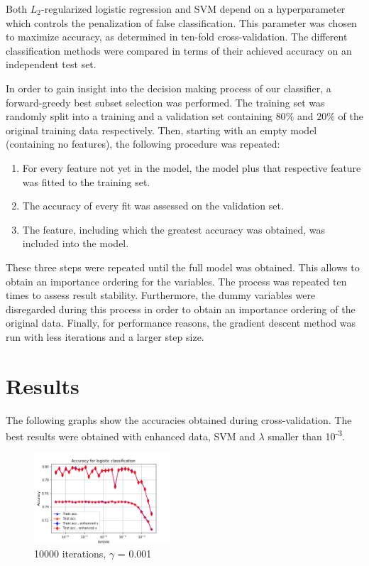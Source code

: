 \documentclass[10pt,conference,compsocconf]{IEEEtran}
\begin{document}
\par
Both $L_2$-regularized logistic regression and SVM depend on a hyperparameter which controls the penalization of false classification. This parameter was chosen to maximize accuracy, as determined in ten-fold cross-validation. The different classification methods were compared in terms of their achieved accuracy on an independent test set. %
\par
In order to gain insight into the decision making process of our classifier, a forward-greedy best subset selection was performed. The training set was randomly split into a training and a validation set containing $80\%$ and $20\%$ of the original training data respectively. Then, starting with an empty model (containing no features), the following procedure was repeated: 
\begin{enumerate}
	\item For every feature not yet in the model, the model plus that respective feature was fitted to the training set.
	\item The accuracy of every fit was assessed on the validation set.  
	\item The feature, including which the greatest accuracy was obtained, was included into the model.
\end{enumerate}
These three steps were repeated until the full model was obtained. This allows to obtain an importance ordering for the variables. The process was repeated ten times to assess result stability. Furthermore, the dummy variables were disregarded during this process in order to obtain an importance ordering of the original data. Finally, for performance reasons, the gradient descent method was run with less iterations and a larger step size.
\section*{Results}
The following graphs show the accuracies obtained during cross-validation. The best results were obtained with enhanced data, SVM and $\lambda$ smaller than 10\textsuperscript{-3}.
\begin{figure}[H]
	\centering
	\includegraphics[width=0.45\textwidth]{accuracy_logistic.png}
	\caption{10000 iterations, $\gamma$ = 0.001}
\end{figure}
\end{document}
